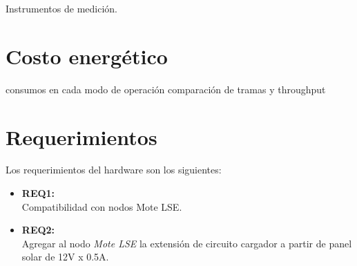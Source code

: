 Instrumentos de medición. 


\section{Costo energético}
\label{sec:costo}
consumos en cada modo de operación
comparación de tramas y throughput


\clearpage
\section{Requerimientos}
\label{sec:requerimientos}

\noindent Los requerimientos del hardware son los siguientes:
\begin{itemize}
	\item \textbf{REQ1:}\\ Compatibilidad con nodos Mote LSE.
	\item \textbf{REQ2:}\\ Agregar al nodo \textit{Mote LSE} la extensión de circuito cargador a partir de panel solar de 12V x 0.5A.
\end{itemize}
	
